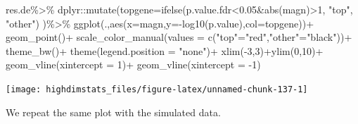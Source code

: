 \documentclass[
]{book}
\newenvironment{Shaded}{\begin{snugshade}}{\end{snugshade}}
\newcommand{\AttributeTok}[1]{\textcolor[rgb]{0.77,0.63,0.00}{#1}}
\newcommand{\DecValTok}[1]{\textcolor[rgb]{0.00,0.00,0.81}{#1}}
\newcommand{\FloatTok}[1]{\textcolor[rgb]{0.00,0.00,0.81}{#1}}
\newcommand{\FunctionTok}[1]{\textcolor[rgb]{0.00,0.00,0.00}{#1}}
\newcommand{\NormalTok}[1]{#1}
\newcommand{\OtherTok}[1]{\textcolor[rgb]{0.56,0.35,0.01}{#1}}
\newcommand{\SpecialCharTok}[1]{\textcolor[rgb]{0.00,0.00,0.00}{#1}}
\newcommand{\StringTok}[1]{\textcolor[rgb]{0.31,0.60,0.02}{#1}}
\begin{document}
\begin{Shaded}
\begin{Highlighting}[]
\NormalTok{res.de}\SpecialCharTok{\%\textgreater{}\%}
\NormalTok{  dplyr}\SpecialCharTok{::}\FunctionTok{mutate}\NormalTok{(}\AttributeTok{topgene=}\FunctionTok{ifelse}\NormalTok{(p.value.fdr}\SpecialCharTok{\textless{}}\FloatTok{0.05}\SpecialCharTok{\&}\FunctionTok{abs}\NormalTok{(magn)}\SpecialCharTok{\textgreater{}}\DecValTok{1}\NormalTok{,}
                               \StringTok{"top"}\NormalTok{,}
                               \StringTok{"other"}\NormalTok{)}
\NormalTok{                )}\SpecialCharTok{\%\textgreater{}\%}
  \FunctionTok{ggplot}\NormalTok{(.,}\FunctionTok{aes}\NormalTok{(}\AttributeTok{x=}\NormalTok{magn,}\AttributeTok{y=}\SpecialCharTok{{-}}\FunctionTok{log10}\NormalTok{(p.value),}\AttributeTok{col=}\NormalTok{topgene))}\SpecialCharTok{+}
  \FunctionTok{geom\_point}\NormalTok{()}\SpecialCharTok{+}
  \FunctionTok{scale\_color\_manual}\NormalTok{(}\AttributeTok{values =} \FunctionTok{c}\NormalTok{(}\StringTok{"top"}\OtherTok{=}\StringTok{"red"}\NormalTok{,}\StringTok{"other"}\OtherTok{=}\StringTok{"black"}\NormalTok{))}\SpecialCharTok{+}
  \FunctionTok{theme\_bw}\NormalTok{()}\SpecialCharTok{+}
  \FunctionTok{theme}\NormalTok{(}\AttributeTok{legend.position =} \StringTok{"none"}\NormalTok{)}\SpecialCharTok{+}
  \FunctionTok{xlim}\NormalTok{(}\SpecialCharTok{{-}}\DecValTok{3}\NormalTok{,}\DecValTok{3}\NormalTok{)}\SpecialCharTok{+}\FunctionTok{ylim}\NormalTok{(}\DecValTok{0}\NormalTok{,}\DecValTok{10}\NormalTok{)}\SpecialCharTok{+}
  \FunctionTok{geom\_vline}\NormalTok{(}\AttributeTok{xintercept =} \DecValTok{1}\NormalTok{)}\SpecialCharTok{+}
  \FunctionTok{geom\_vline}\NormalTok{(}\AttributeTok{xintercept =} \SpecialCharTok{{-}}\DecValTok{1}\NormalTok{)}
\end{Highlighting}
\end{Shaded}

\begin{center}\texttt{[image: highdimstats\_files/figure-latex/unnamed-chunk-137-1]} \end{center}

We repeat the same plot with the simulated data.
\end{document}
